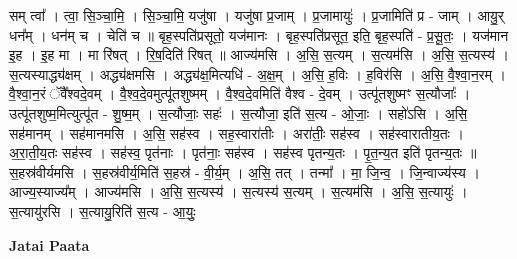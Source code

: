 \documentclass[17pt]{extarticle}
\begin{document}
सम् त्वा᳚ । त्वा॒ सि॒ञ्चा॒मि॒ । सि॒ञ्चा॒मि॒ यजु॑षा । यजु॑षा प्र॒जाम् । प्र॒जामायुः॑ । प्र॒जामिति॑ प्र - जाम् । आयु॒र् धन᳚म् । धन॑म् च । चेति॑ च ॥ बृह॒स्पति॑प्रसूतो॒ यज॑मानः । बृह॒स्पति॑प्रसूत॒ इति॒ बृह॒स्पति॑ - प्र॒सू॒तः॒ । यज॑मान इ॒ह । इ॒ह मा । मा रि॑षत् । रि॒ष॒दिति॑ रिषत् ॥ आज्य॑मसि । अ॒सि॒ स॒त्यम् । स॒त्यम॑सि । अ॒सि॒ स॒त्यस्य॑ । स॒त्यस्याद्ध्य॑क्षम् । अद्ध्य॑क्षमसि । अद्ध्य॑क्ष॒मित्यधि॑ - अ॒क्ष॒म् । अ॒सि॒ ह॒विः । ह॒विर॑सि । अ॒सि॒ वै॒श्वा॒न॒रम् । वै॒श्वा॒न॒रं ॅवै᳚श्वदे॒वम् । वै॒श्व॒दे॒वमुत्पू॑तशुष्मम् । वै॒श्व॒दे॒वमिति॑ वैश्व - दे॒वम् । उत्पू॑तशुष्मꣳ स॒त्यौजाः᳚ । उत्पू॑तशुष्म॒मित्युत्पू॑त - शु॒ष्म॒म् । स॒त्यौजाः॒ सहः॑ । स॒त्यौजा॒ इति॑ स॒त्य - ओ॒जाः॒ । सहो॑ऽसि । अ॒सि॒ सह॑मानम् । सह॑मानमसि । अ॒सि॒ सह॑स्व । सह॒स्वारा॑तीः । अरा॑तीः॒ सह॑स्व । सह॑स्वारातीय॒तः । अ॒रा॒ती॒य॒तः सह॑स्व । सह॑स्व॒ पृत॑नाः । पृत॑नाः॒ सह॑स्व । सह॑स्व पृतन्य॒तः । पृ॒त॒न्य॒त इति॑ पृतन्य॒तः ॥ स॒हस्र॑वीर्यमसि । स॒हस्र॑वीर्य॒मिति॑ स॒हस्र॑ - वी॒र्य॒म् । अ॒सि॒ तत् । तन्मा᳚ । मा॒ जि॒न्व॒ । जि॒न्वाज्य॑स्य । आज्य॒स्याज्य᳚म् । आज्य॑मसि । अ॒सि॒ स॒त्यस्य॑ । स॒त्यस्य॑ स॒त्यम् । स॒त्यम॑सि । अ॒सि॒ स॒त्यायुः॑ । स॒त्यायु॑रसि । स॒त्यायु॒रिति॑ स॒त्य - आ॒युः॒ \newline

\textbf{Jatai Paata} \newline
\end{document}
